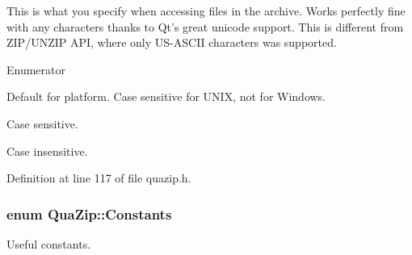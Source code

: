 This is what you specify when accessing files in the archive. Works perfectly fine with any characters thanks to Qt's great unicode support. This is different from Z\-I\-P/\-U\-N\-Z\-I\-P A\-P\-I, where only U\-S-\/\-A\-S\-C\-I\-I characters was supported. \begin{Desc}
\item[Enumerator]\par
\begin{description}
\item[{\em 
\hypertarget{class_qua_zip_a6053a1d249ed210a85c9d5eb7cf9cdbeac3cca8c0b976cf6397a28a5c84e75253}{cs\-Default}\label{class_qua_zip_a6053a1d249ed210a85c9d5eb7cf9cdbeac3cca8c0b976cf6397a28a5c84e75253}
}]Default for platform. Case sensitive for U\-N\-I\-X, not for Windows. \item[{\em 
\hypertarget{class_qua_zip_a6053a1d249ed210a85c9d5eb7cf9cdbead8d86b0c34203336cad09348cfa5356e}{cs\-Sensitive}\label{class_qua_zip_a6053a1d249ed210a85c9d5eb7cf9cdbead8d86b0c34203336cad09348cfa5356e}
}]Case sensitive. \item[{\em 
\hypertarget{class_qua_zip_a6053a1d249ed210a85c9d5eb7cf9cdbea3e492bcc3f64f41a74906cecc45fb366}{cs\-Insensitive}\label{class_qua_zip_a6053a1d249ed210a85c9d5eb7cf9cdbea3e492bcc3f64f41a74906cecc45fb366}
}]Case insensitive. \end{description}
\end{Desc}


Definition at line 117 of file quazip.\-h.

\hypertarget{class_qua_zip_adce46b942c341dbb5c851eadead65459}{
\subsubsection[{Constants}]{\setlength{\rightskip}{0pt plus 5cm}enum {\bf Qua\-Zip\-::\-Constants}}}\label{class_qua_zip_adce46b942c341dbb5c851eadead65459}


Useful constants. 

